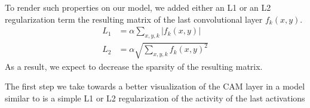 \documentclass[12pt, letterpaper, twoside]{article}
\begin{document}
		To render such properties on our model, we added either an L1 or an L2 regularization term the resulting matrix of the last convolutional layer $f_k(x,y)$.
		\begin{equation}
			\begin{aligned}
				L_1 &= \alpha \sum_{x,y,k} |f_k(x,y)| \\
				L_2 &= \alpha \sqrt{\sum_{x,y,k} f_k(x,y)^2}
			\end{aligned}
		\end{equation}
		As a result, we expect to decrease the sparsity of the resulting matrix.




		The first step we take towards a better visualization of the CAM layer in a model similar to \cite{zhou2016learning} is a simple L1 or L2 regularization of the activity of the last activations 



\newpage


\end{document}
